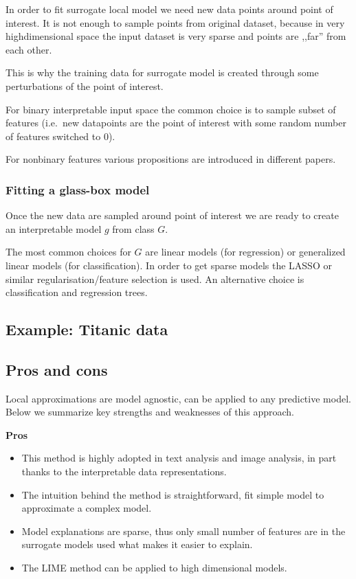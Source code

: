 \documentclass[12pt,]{krantz}
\providecommand{\tightlist}{%
  \setlength{\itemsep}{0pt}\setlength{\parskip}{0pt}}
\theoremstyle{definition}
\theoremstyle{definition}
\theoremstyle{definition}
\theoremstyle{remark}
\begin{document}
In order to fit surrogate local model we need new data points around
point of interest. It is not enough to sample points from original
dataset, because in very highdimensional space the input dataset is very
sparse and points are ,,far'' from each other.

This is why the training data for surrogate model is created through
some perturbations of the point of interest.

For binary interpretable input space the common choice is to sample
subset of features (i.e.~new datapoints are the point of interest with
some random number of features switched to 0).

For nonbinary features various propositions are introduced in different
papers.

\hypertarget{fitting-a-glass-box-model}{%
\subsubsection{Fitting a glass-box
model}\label{fitting-a-glass-box-model}}

Once the new data are sampled around point of interest we are ready to
create an interpretable model \(g\) from class \(G\).

The most common choices for \(G\) are linear models (for regression) or
generalized linear models (for classification). In order to get sparse
models the LASSO or similar regularisation/feature selection is used. An
alternative choice is classification and regression trees.

\hypertarget{example-titanic-data-1}{%
\subsection{Example: Titanic data}\label{example-titanic-data-1}}

\hypertarget{pros-and-cons-3}{%
\subsection{Pros and cons}\label{pros-and-cons-3}}

Local approximations are model agnostic, can be applied to any
predictive model. Below we summarize key strengths and weaknesses of
this approach.

\textbf{Pros}

\begin{itemize}
\tightlist
\item
  This method is highly adopted in text analysis and image analysis, in
  part thanks to the interpretable data representations.
\item
  The intuition behind the method is straightforward, fit simple model
  to approximate a complex model.
\item
  Model explanations are sparse, thus only small number of features are
  in the surrogate models used what makes it easier to explain.
\item
  The LIME method can be applied to high dimensional models.
\end{itemize}
\end{document}
